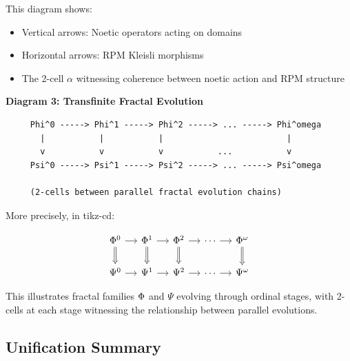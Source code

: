 This diagram shows:
\begin{itemize}
  \item Vertical arrows: Noetic operators acting on domains
  \item Horizontal arrows: RPM Kleisli morphisms
  \item The 2-cell $\alpha$ witnessing coherence between noetic action and RPM structure
\end{itemize}

\begin{center}
\textbf{Diagram 3: Transfinite Fractal Evolution}
\end{center}

\begin{verbatim}
     Phi^0 -----> Phi^1 -----> Phi^2 -----> ... -----> Phi^omega
       |           |           |                         |
       v           v           v           ...           v
     Psi^0 -----> Psi^1 -----> Psi^2 -----> ... -----> Psi^omega

     (2-cells between parallel fractal evolution chains)
\end{verbatim}

More precisely, in tikz-cd:

\[
\begin{tikzcd}[column sep=small]
  \TransFrac{0} \arrow[r] \arrow[d, Rightarrow]
  & \TransFrac{1} \arrow[r] \arrow[d, Rightarrow]
  & \TransFrac{2} \arrow[r] \arrow[d, Rightarrow]
  & \cdots \arrow[r]
  & \TransFrac{\omega} \arrow[d, Rightarrow]
  \\
  \Psi^{0} \arrow[r]
  & \Psi^{1} \arrow[r]
  & \Psi^{2} \arrow[r]
  & \cdots \arrow[r]
  & \Psi^{\omega}
\end{tikzcd}
\]

This illustrates fractal families $\Phi$ and $\Psi$ evolving through ordinal stages,
with 2-cells at each stage witnessing the relationship between parallel evolutions.

\subsection{Unification Summary}

